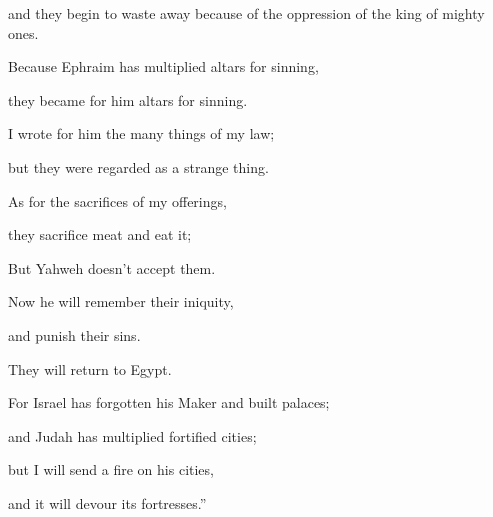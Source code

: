 {\par }{\QB and they begin to waste away because of the oppression of the king of mighty ones.
\par }{\Q {}Because Ephraim has multiplied altars for sinning,
\par }{\QB they became for him altars for sinning.
\par }{\Q {}I wrote for him the many things of my law;
\par }{\QB but they were regarded as a strange thing.
\par }{\Q {}As for the sacrifices of my offerings,
\par }{\QB they sacrifice meat and eat it;
\par }{\QB But Yahweh doesn’t accept them.
\par }{\Q Now he will remember their iniquity,
\par }{\QB and punish their sins.
\par }{\QB They will return to Egypt.
\par }{\Q {}For Israel has forgotten his Maker and built palaces;
\par }{\QB and Judah has multiplied fortified cities;
\par }{\QB but I will send a fire on his cities,
\par }{\QB and it will devour its fortresses.”
\par }{\BB \par }

